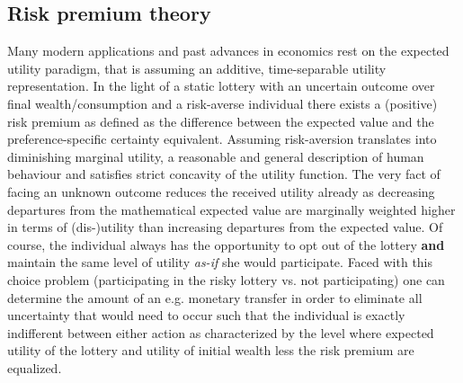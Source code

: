 \subsection{Risk premium theory} \label{Risk premium theory}
Many modern applications and past advances in economics rest on the expected utility paradigm, that is assuming an additive, time-separable utility representation. In the light of a static lottery with an uncertain outcome over final wealth/consumption and a risk-averse individual there exists a (positive) risk premium as defined as the difference between the expected value and the preference-specific certainty equivalent. Assuming risk-aversion translates into diminishing marginal utility, a reasonable and general description of human behaviour and satisfies strict concavity of the utility function. The very fact of facing an unknown outcome reduces the received utility already as decreasing departures from the mathematical expected value are marginally weighted higher in terms of (dis-)utility than increasing departures from the expected value. %
Of course, the individual always has the opportunity to opt out of the lottery \textbf{and} maintain the same level of utility \textit{as-if} she would participate. Faced with this choice problem (participating in the risky lottery vs. not participating) one can determine the amount of an e.g. monetary transfer in order to eliminate all uncertainty that would need to occur such that the individual is exactly indifferent between either action as characterized by the level where expected utility of the lottery and utility of initial wealth less the risk premium are equalized.

